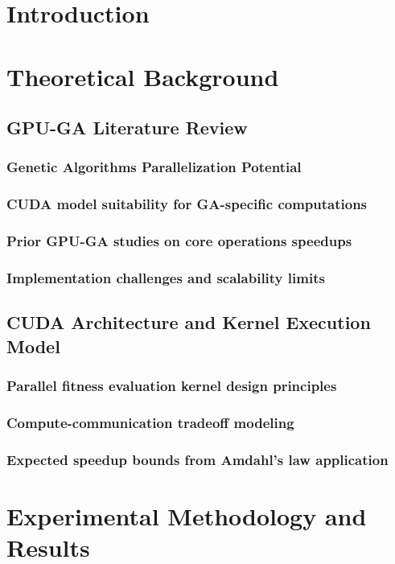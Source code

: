 \documentclass[a4paper,14pt]{extarticle}
\begin{document}
\tableofcontents
\newpage

\section{Introduction}
\section{Theoretical Background}

\subsection{GPU-GA Literature Review}
\subsubsection{Genetic Algorithms Parallelization Potential}
\subsubsection{CUDA model suitability for GA-specific computations}
\subsubsection{Prior GPU-GA studies on core operations speedups}
\subsubsection{Implementation challenges and scalability limits}

\subsection{CUDA Architecture and Kernel Execution Model}
\subsubsection{Parallel fitness evaluation kernel design principles}
\subsubsection{Compute-communication tradeoff modeling}
\subsubsection{Expected speedup bounds from Amdahl’s law application}

\section{Experimental Methodology and Results}
\end{document}
